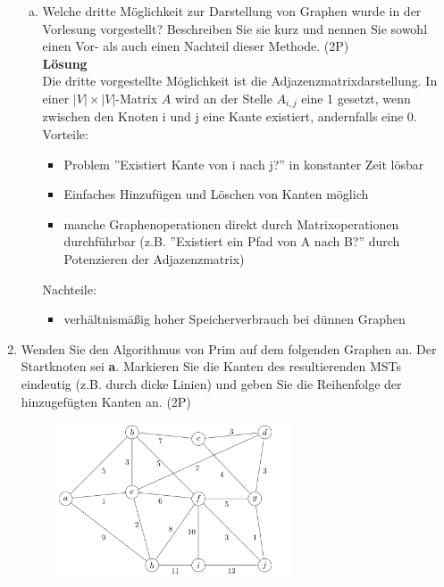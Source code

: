 \documentclass{scrartcl}
\begin{document}
\begin{enumerate}[(1)]
\begin{enumerate}[(a)]
	\item Welche dritte Möglichkeit zur Darstellung von Graphen wurde in der Vorlesung vorgestellt? Beschreiben Sie sie kurz und nennen Sie sowohl einen Vor- als auch einen Nachteil dieser Methode. (2P)\\
	\textbf{Lösung}\\
	Die dritte vorgestellte Möglichkeit ist die Adjazenzmatrixdarstellung. In einer $|V| \times |V|$-Matrix $A$ wird an der Stelle $A_{i,j}$ eine 1 gesetzt, wenn zwischen den Knoten i und j eine Kante existiert, andernfalls eine 0.\\
	Vorteile:
	\begin{itemize}
		\item Problem ''Existiert Kante von i nach j?'' in konstanter Zeit lösbar
		\item Einfaches Hinzufügen und Löschen von Kanten möglich
		\item manche Graphenoperationen direkt durch Matrixoperationen durchführbar (z.B. ''Existiert ein Pfad von A nach B?'' durch Potenzieren der Adjazenzmatrix)
	\end{itemize}
	Nachteile:
	\begin{itemize}
		\item verhältnismäßig hoher Speicherverbrauch bei dünnen Graphen
	\end{itemize}
\end{enumerate} 

\item Wenden Sie den Algorithmus von Prim auf dem folgenden Graphen an. Der Startknoten sei \textbf{a}. Markieren Sie die Kanten des resultierenden MSTs eindeutig (z.B. durch dicke Linien) und geben Sie die Reihenfolge der hinzugefügten Kanten an. (2P)
\begin{figure}[h]
\centering
\includegraphics[width=0.66\textwidth]{mst_graph.png}
\end{figure}
\pagebreak


\end{enumerate}
\end{document}
